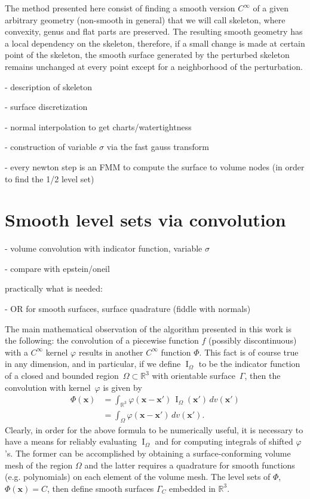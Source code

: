 \documentclass[11pt, oneside]{article}
\DeclareMathOperator\indic{I}
\newcommand\bbR{\mathbb R}
\newcommand\bx{\boldsymbol x}
\renewcommand{\phi}{\varphi}
\begin{document}
The method presented here consist of finding a smooth version $C^{\infty}$ of a given arbitrary geometry (non-smooth in general) that we will call skeleton, where convexity, genus and flat parts are preserved. The resulting smooth geometry has a local dependency on the skeleton, therefore, if a small change is made at certain point of the skeleton, the smooth surface generated by the perturbed skeleton remains unchanged at every point except for a neighborhood of the perturbation.




- description of skeleton

- surface discretization

- normal interpolation to get charts/watertightness

- construction of variable $\sigma$ via the fast gauss transform

- every newton step is an FMM to compute the surface to volume nodes
(in order to find the 1/2 level set)









\section{Smooth level sets via convolution}

- volume convolution with indicator function, variable $\sigma$

- compare with epstein/oneil

practically what is needed:



- OR for smooth surfaces, surface quadrature (fiddle with normals)



The main mathematical observation of the algorithm presented in this work is
the following: the convolution of a piecewise function $f$ (possibly discontinuous)
with a $C^\infty$ kernel $\phi$ results in another $C^\infty$ function $\Phi$. This
fact is of course true in any dimension, and in particular, if we define $\indic_\Omega$
to be the indicator function of a closed and bounded region~$\Omega \subset \bbR^3$ with
orientable surface~$\Gamma$, then the convolution with kernel~$\phi$ is given by
\begin{equation}
\begin{aligned}
\Phi(\bx) &= \int_{\bbR^3} \phi(\bx-\bx') \, \indic_\Omega(\bx') \, dv(\bx') \\
 &= \int_{\Omega} \phi(\bx-\bx')  \, dv(\bx').
\end{aligned}
\end{equation}
Clearly, in order for the above formula to be numerically useful, it is necessary
to have a means for reliably evaluating $\indic_\Omega$ and for computing integrals
of shifted $\phi$'s. The former can be accomplished by obtaining a surface-conforming 
volume mesh of the region $\Omega$ and the latter requires a quadrature for smooth
functions (e.g. polynomials) on each element of the volume mesh. The level sets of $\Phi$,
$\Phi(\bx) = C$, then define smooth surfaces $\Gamma_C$ embedded in $\bbR^3$.
\end{document}
